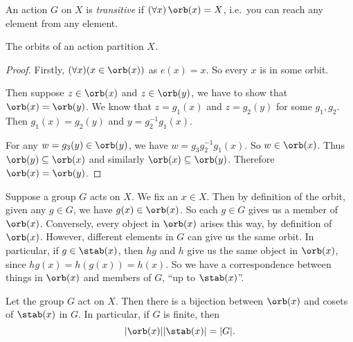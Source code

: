 \documentclass[a4paper]{article}
\begin{document}
\begin{defi}
  An action $G$ on $X$ is \emph{transitive} if $(\forall x)\,\orb(x) = X$, i.e.\ you can reach any element from any element.
\end{defi}

\begin{lemma}
  The orbits of an action partition $X$.
\end{lemma}

\begin{proof}
  Firstly, $(\forall x)(x\in \orb (x))$ as $e(x) = x$. So every $x$ is in some orbit.

  Then suppose $z\in \orb (x)$ and $z\in \orb (y)$, we have to show that $\orb(x) = \orb (y)$. We know that $z = g_1(x)$ and $z = g_2(y)$ for some $g_1, g_2$. Then $g_1(x) = g_2(y)$ and $y = g_2^{-1}g_1(x)$.

  For any $w = g_3(y)\in \orb (y)$, we have $w = g_3g_2^{-1}g_1(x)$. So $w\in \orb (x)$. Thus $\orb (y) \subseteq \orb (x)$ and similarly $\orb (x) \subseteq \orb (y)$. Therefore $\orb (x) = \orb (y)$.
\end{proof}

Suppose a group $G$ acts on $X$. We fix an $x \in X$. Then by definition of the orbit, given any $g \in G$, we have $g(x) \in \orb(x)$. So each $g \in G$ gives us a member of $\orb(x)$. Conversely, every object in $\orb(x)$ arises this way, by definition of $\orb(x)$. However, different elements in $G$ can give us the same orbit. In particular, if $g \in \stab(x)$, then $hg$ and $h$ give us the same object in $\orb(x)$, since $hg(x) = h(g(x)) = h(x)$. So we have a correspondence between things in $\orb(x)$ and members of $G$, ``up to $\stab (x)$''.

\begin{thm}
  Let the group $G$ act on $X$. Then there is a bijection between $\orb(x)$ and cosets of $\stab(x)$ in $G$. In particular, if $G$ is finite, then
  \[
    |\orb(x)||\stab(x)| = |G|.
  \]
\end{thm}
\end{document}
